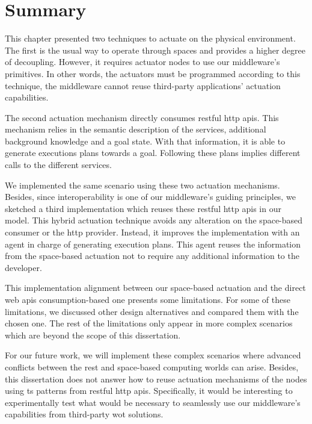 \section{Summary}
\label{sec:actuation_summary}

This chapter presented two techniques to actuate on the physical environment.
The first is the usual way to operate through spaces and provides a higher degree of decoupling.
However, it requires actuator nodes to use our middleware's primitives. %
In other words, the actuators must be programmed according to this technique, the middleware cannot reuse third-party applications' actuation capabilities.


The second actuation mechanism directly consumes \ac{rest}ful \acs{http} \acsp{api}.
This mechanism relies in the semantic description of the services, additional background knowledge and a goal state. %
With that information, it is able to generate executions plans towards a goal.
Following these plans implies different calls to the different services.


We implemented the same scenario using these two actuation mechanisms.
Besides, since interoperability is one of our middleware's guiding principles, we sketched a third implementation which reuses these \ac{rest}ful \acs{http} \acsp{api} in our \Space{} model.
This hybrid actuation technique avoids any alteration on the space-based consumer or the \ac{http} provider.
Instead, it improves the \Space{} implementation with an agent in charge of generating execution plans.
This agent reuses the information from the space-based actuation not to require any additional information to the developer.


This implementation alignment between our space-based actuation and the direct web \acsp{api} consumption-based one presents some limitations.
For some of these limitations, we discussed other design alternatives and compared them with the chosen one.
The rest of the limitations only appear in more complex scenarios which are beyond the scope of this dissertation.


For our future work, we will implement these complex scenarios where advanced conflicts between the \ac{rest} and space-based computing worlds can arise.
Besides, this dissertation does not answer how to reuse actuation mechanisms of the nodes using \ac{ts} patterns from \ac{rest}ful \acs{http} \acsp{api}.
Specifically, it would be interesting to experimentally test what would be necessary to seamlessly use our middleware's capabilities from  third-party \ac{wot} solutions.